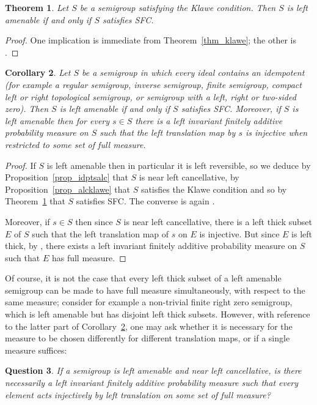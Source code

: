 \documentclass[11pt,a4paper,reqno]{amsart}
\newtheorem{theorem}{Theorem}[section]
\newtheorem{question}[theorem]{Question}
\newtheorem{corollary}[theorem]{Corollary}
\begin{document}
\begin{theorem}\label{thm_klawesfc}
Let $S$ be a semigroup satisfying the Klawe condition. Then $S$ is left amenable if and only
if $S$ satisfies SFC.
\end{theorem}
\begin{proof}
One implication is immediate from Theorem~\ref{thm_klawe}; the other is
\cite[Theorem~1]{Argabright67}.
\end{proof}

\begin{corollary}\label{cor_idptsfc}
Let $S$ be a semigroup in which every ideal contains an idempotent (for example a regular semigroup,
inverse semigroup, finite semigroup, compact left or right topological semigroup, or semigroup with a left, right or two-sided zero). Then $S$ is left amenable if and only if $S$ satisfies SFC.
Moreover, if $S$ is left amenable then for every $s \in S$ there is a left invariant
finitely additive probability measure on $S$
such that the left  translation map by $s$ is injective when restricted to some set of full measure.
\end{corollary}
\begin{proof}
If $S$ is left amenable then in particular it is left reversible, so we deduce by Proposition~\ref{prop_idptsalc} that $S$ is near left cancellative, by Proposition~\ref{prop_alcklawe} that $S$ satisfies
the Klawe condition and so by Theorem~\ref{thm_klawesfc} that $S$ satisfies
SFC. The converse is again \cite[Theorem~1]{Argabright67}.

Moreover, if $s \in S$ then since $S$ is near left cancellative, there
is a left thick subset $E$ of $S$ such that the left translation map of $s$
on $E$ is injective. But since $E$ is left thick, by \cite[Proposition~1.21]{Paterson88},
there exists a left invariant finitely additive probability measure on $S$ such that $E$ has full measure.
\end{proof}

Of course, it is not the case that every left thick subset of
a left amenable semigroup can be made to have full measure simultaneously,
with respect to the same measure; consider for example a non-trivial finite
right
zero semigroup, which is left amenable but has disjoint left thick subsets.
However, with reference to the latter part of Corollary~\ref{cor_idptsfc},
one may ask whether
it is necessary for the measure to be chosen differently for different
translation maps, or if a single measure suffices:
\begin{question}
If a semigroup is left amenable and near left cancellative, is there
necessarily 
a left invariant finitely additive probability measure such that every
element acts injectively by
left translation on some set of full measure?
\end{question}
\end{document}
